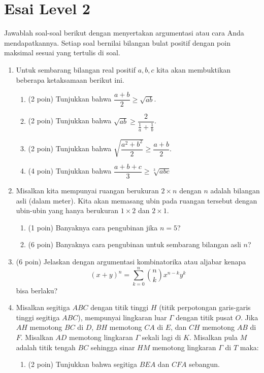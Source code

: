 \documentclass[12pt]{scrartcl}
\begin{document}
\section{Esai Level 2}
Jawablah soal-soal berikut dengan menyertakan argumentasi atau cara Anda mendapatkannya. Setiap soal bernilai bilangan bulat positif dengan poin maksimal sesuai yang tertulis di soal.

\begin{enumerate}[resume]
	\item Untuk sembarang bilangan real positif $a,b,c$ kita akan membuktikan beberapa ketaksamaan berikut ini.
	\begin{enumerate}
		\item (2 poin) Tunjukkan bahwa $\dfrac{a+b}{2} \ge \sqrt{ab}$.
		
		\item (2 poin) Tunjukkan bahwa $\sqrt{ab} \ge \dfrac{2}{\frac{1}{a}+\frac{1}{b}}$.
		
		\item (2 poin) Tunjukkan bahwa $\sqrt{\dfrac{a^2+b^2}{2}} \ge \dfrac{a+b}{2}$.
		
		\item (4 poin) Tunjukkan bahwa $\dfrac{a+b+c}{3} \ge \sqrt[3]{abc}$\\
	
	\end{enumerate}

	\item Misalkan kita mempunyai ruangan berukuran $2 \times n$ dengan $n$ adalah bilangan asli (dalam meter). Kita akan memasang ubin pada ruangan tersebut dengan ubin-ubin yang hanya berukuran $1 \times 2$ dan $2 \times 1$.
	\begin{enumerate}
		\item (1 poin) Banyaknya cara pengubinan jika $n = 5$?
		\item (6 poin) Banyaknya cara pengubinan untuk sembarang bilangan asli $n$?
	\end{enumerate}

	\item (6 poin) Jelaskan dengan argumentasi kombinatorika atau aljabar kenapa $$(x+y)^n = \sum_{k=0}^{n} {n \choose k} x^{n-k}y^{k}$$ bisa berlaku?
	
	\item Misalkan segitiga $ABC$ dengan titik tinggi $H$ (titik perpotongan garis-garis tinggi segitiga $ABC$), mempunyai lingkaran luar $\Gamma$ dengan titik pusat $O$. Jika $AH$ memotong $BC$ di $D$, $BH$ memotong $CA$ di $E$, dan $CH$ memotong $AB$ di $F$. Misalkan $AD$ memotong lingkaran $\Gamma$ sekali lagi di $K$. Misalkan pula $M$ adalah titik tengah $BC$ sehingga sinar $HM$ memotong lingkaran $\Gamma$ di $T$ maka:
	\begin{enumerate}
		\item (2 poin) Tunjukkan bahwa segitiga $BEA$ dan $CFA$ sebangun.
		

\end{enumerate}
\end{enumerate}
\end{document}
